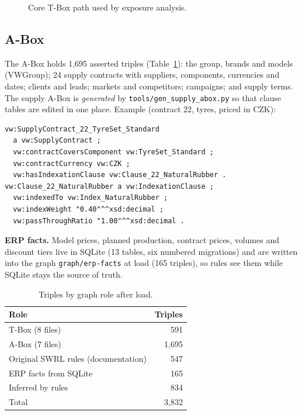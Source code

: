 \documentclass[conference]{IEEEtran}
\begin{document}
\begin{figure}[t]
\centering
{}
\caption{Core T-Box path used by exposure analysis.}\label{fig:tbox}
\end{figure}

\subsection{A-Box}
The A-Box holds 1{,}695 asserted triples (Table~\ref{tab:abox}): the group, brands and models (VWGroup); 24 supply contracts with suppliers, components, currencies and dates; clients and leads; markets and competitors; campaigns; and supply terms. The supply A-Box is \emph{generated} by \texttt{tools/gen\_supply\_abox.py} so that clause tables are edited in one place.
Example (contract 22, tyres, priced in CZK):
\begin{lstlisting}
vw:SupplyContract_22_TyreSet_Standard
  a vw:SupplyContract ;
  vw:contractCoversComponent vw:TyreSet_Standard ;
  vw:contractCurrency vw:CZK ;
  vw:hasIndexationClause vw:Clause_22_NaturalRubber .
vw:Clause_22_NaturalRubber a vw:IndexationClause ;
  vw:indexedTo vw:Index_NaturalRubber ;
  vw:indexWeight "0.40"^^xsd:decimal ;
  vw:passThroughRatio "1.00"^^xsd:decimal .
\end{lstlisting}
\textbf{ERP facts.} Model prices, planned production, contract prices, volumes and discount tiers live in SQLite (13 tables, six numbered migrations) and are written into the graph \texttt{graph/erp-facts} at load (165 triples), so rules see them while SQLite stays the source of truth.

\begin{table}[t]
\centering\caption{Triples by graph role after load.}\label{tab:abox}
\footnotesize
\begin{tabular}{@{}lr@{}}
\toprule
Role & Triples\\
\midrule
T-Box (8 files) & 591\\
A-Box (7 files) & 1{,}695\\
Original SWRL rules (documentation) & 547\\
ERP facts from SQLite & 165\\
Inferred by rules & 834\\
\midrule
Total & 3{,}832\\
\bottomrule
\end{tabular}
\end{table}
\end{document}
